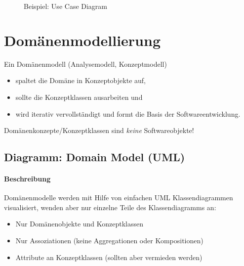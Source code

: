				\begin{figure}[ht]
					\centering
					\caption{Beispiel: Use Case Diagram}
					\label{fig:usecase}
				\end{figure}

	\section{Domänenmodellierung}
		Ein Domänenmodell (Analysemodell, Konzeptmodell)
		\begin{itemize}
			\item spaltet die Domäne in Konzeptobjekte auf,
			\item sollte die Konzeptklassen ausarbeiten und
			\item wird iterativ vervollständigt und formt die Basis der Softwareentwicklung.
		\end{itemize}

		Domänenkonzepte/Konzeptklassen sind \textit{keine} Softwareobjekte!

		\subsection{Diagramm: Domain Model (UML)}
			\label{diagram:domain}

			\paragraph{Beschreibung}
				Domänenmodelle werden mit Hilfe von einfachen UML Klassendiagrammen visualisiert, wenden aber nur einzelne Teile des Klassendiagramms an:
				\begin{itemize}
					\item Nur Domänenobjekte und Konzeptklassen
					\item Nur Assoziationen (keine Aggregationen oder Kompositionen)
					\item Attribute an Konzeptklassen (sollten aber vermieden werden)
				\end{itemize}

